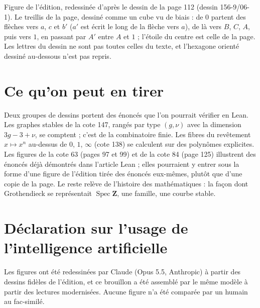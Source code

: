 \documentclass[11pt,a4paper]{article}
\newcommand{\legende}[1]{{\centering\small\color{gray!60!black}#1\par}\medskip}
\newcommand{\cote}[2]{\par\smallskip\noindent{\small\textbf{Cote #1, page #2.}}\par\nopagebreak}
\begin{document}
\cote{156-9}{112}
\begin{center}
\end{center}
\legende{Figure de l'édition, redessinée d'après le dessin de la page 112 (dessin 156-9/06-1). Le treillis de la page, dessiné comme un cube vu de biais : de $0$ partent des flèches vers $a$, $c$ et $b'$ ($a'$ est écrit le long de la flèche vers $a$), de là vers $B$, $C$, $A$, puis vers $1$, en passant par $A'$ entre $A$ et $1$ ; l'étoile du centre est celle de la page. Les lettres du dessin ne sont pas toutes celles du texte, et l'hexagone orienté dessiné au-dessous n'est pas repris.}


\section{Ce qu'on peut en tirer}

Deux groupes de dessins portent des énoncés que l'on pourrait vérifier en Lean. Les graphes stables de la cote 147, rangés par type $(g, \nu)$ avec la dimension $3g - 3 + \nu$, se comptent ; c'est de la combinatoire finie. Les fibres du revêtement $x \mapsto x^n$ au-dessus de $0$, $1$, $\infty$ (cote 138) se calculent sur des polynômes explicites. Les figures de la cote 63 (pages 97 et 99) et de la cote 84 (page 125) illustrent des énoncés déjà démontrés dans l'article Lean ; elles pourraient y entrer sous la forme d'une figure de l'édition tirée des énoncés eux-mêmes, plutôt que d'une copie de la page. Le reste relève de l'histoire des mathématiques : la façon dont Grothendieck se représentait $\operatorname{Spec}\mathbf Z$, une famille, une courbe stable.

\section*{Déclaration sur l'usage de l'intelligence artificielle}
Les figures ont été redessinées par Claude (Opus 5.5, Anthropic) à partir des dessins fidèles de l'édition, et ce brouillon a été assemblé par le même modèle à partir des lectures modernisées. Aucune figure n'a été comparée par un humain au fac-similé.
\end{document}
